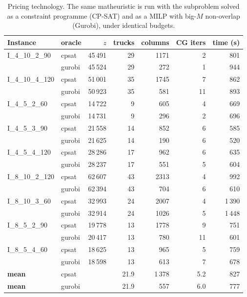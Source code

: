 \begin{table}[!htbp]
\centering
\small
\caption{Pricing technology. The same matheuristic is run with the subproblem solved as a constraint programme (CP-SAT) and as a MILP with big-$M$ non-overlap (Gurobi), under identical budgets.}
\label{tab:oracle}
\begin{tabular}{llrrrrr}
\toprule
Instance & oracle & $z$ & trucks & columns & CG iters & time (s) \\
\midrule
I\_4\_10\_2\_90 & cpsat & 45\,491 & 29 & 1171 & 2 & 801 \\
 & gurobi & 45\,524 & 29 & 272 & 1 & 944 \\
\addlinespace[2pt]
I\_4\_10\_4\_120 & cpsat & 51\,001 & 35 & 1745 & 7 & 862 \\
 & gurobi & 50\,923 & 35 & 581 & 11 & 893 \\
\addlinespace[2pt]
I\_4\_5\_2\_60 & cpsat & 14\,722 & 9 & 605 & 4 & 669 \\
 & gurobi & 14\,731 & 9 & 296 & 2 & 696 \\
\addlinespace[2pt]
I\_4\_5\_3\_90 & cpsat & 21\,558 & 14 & 852 & 6 & 585 \\
 & gurobi & 21\,625 & 14 & 190 & 6 & 520 \\
\addlinespace[2pt]
I\_4\_5\_4\_120 & cpsat & 28\,286 & 17 & 962 & 6 & 635 \\
 & gurobi & 28\,237 & 17 & 551 & 5 & 604 \\
\addlinespace[2pt]
I\_8\_10\_2\_120 & cpsat & 62\,607 & 43 & 2313 & 4 & 992 \\
 & gurobi & 62\,394 & 43 & 704 & 6 & 610 \\
\addlinespace[2pt]
I\_8\_10\_3\_60 & cpsat & 32\,993 & 24 & 2007 & 4 & 1\,390 \\
 & gurobi & 32\,914 & 24 & 1026 & 5 & 1\,448 \\
\addlinespace[2pt]
I\_8\_5\_2\_90 & cpsat & 19\,778 & 13 & 1778 & 9 & 751 \\
 & gurobi & 20\,417 & 13 & 780 & 11 & 601 \\
\addlinespace[2pt]
I\_8\_5\_4\_60 & cpsat & 18\,625 & 13 & 965 & 5 & 759 \\
 & gurobi & 18\,598 & 13 & 613 & 7 & 678 \\
\addlinespace[2pt]
\midrule
\textbf{mean} & cpsat & & 21.9 & 1\,378 & 5.2 & 827 \\

\textbf{mean} & gurobi & & 21.9 & 557 & 6.0 & 777 \\
\bottomrule
\end{tabular}
\end{table}

